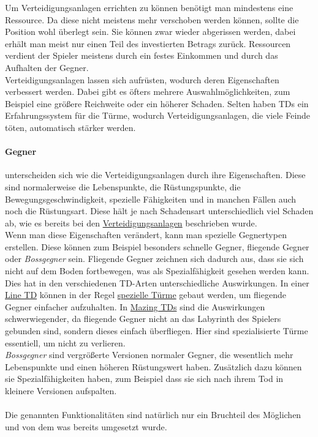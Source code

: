Um Verteidigungsanlagen errichten zu können benötigt man mindestens eine Ressource. Da diese nicht meistens mehr verschoben werden können, sollte die Position wohl überlegt sein. Sie können zwar wieder abgerissen werden, dabei erhält man meist nur einen Teil des investierten Betrags zurück. Ressourcen verdient der Spieler meistens durch ein festes Einkommen und durch das Aufhalten der Gegner.\\
Verteidigungsanlagen lassen sich aufrüsten, wodurch deren Eigenschaften verbessert werden. Dabei gibt es öfters mehrere Auswahlmöglichkeiten, zum Beispiel eine größere Reichweite oder ein höherer Schaden. Selten haben TDs ein Erfahrungssystem für die Türme, wodurch Verteidigungsanlagen, die viele Feinde töten, automatisch stärker werden.

\paragraph{Gegner} unterscheiden sich wie die Verteidigungsanlagen durch ihre Eigenschaften. Diese sind normalerweise die Lebenspunkte, die Rüstungspunkte, die Bewegungsgeschwindigkeit, spezielle Fähigkeiten und in manchen Fällen auch noch die Rüstungsart. Diese hält je nach Schadensart unterschiedlich viel Schaden ab, wie es bereits bei den \hyperlink{Schadensarten}{Verteidigungsanlagen} beschrieben wurde.\\
Wenn man diese Eigenschaften verändert, kann man spezielle \hypertarget{DefintionGegnertypen}{Gegnertypen} erstellen. Diese können zum Beispiel besonders schnelle Gegner, fliegende Gegner oder \textit{Bossgegner} sein. Fliegende Gegner zeichnen sich dadurch aus, dass sie sich nicht auf dem Boden fortbewegen, was als Spezialfähigkeit gesehen werden kann. Dies hat in den verschiedenen TD-Arten unterschiedliche Auswirkungen. In einer \hyperlink{DefinitionLineTD}{Line TD} können in der Regel \hyperlink{DefinitionVerteidungsanlageTypen}{spezielle Türme} gebaut werden, um fliegende Gegner einfacher aufzuhalten. In \hyperlink{DefinitionMazingTD}{Mazing TDs} sind die Auswirkungen schwerwiegender, da fliegende Gegner nicht an das Labyrinth des Spielers gebunden sind, sondern dieses einfach überfliegen. Hier sind spezialisierte Türme essentiell, um nicht zu verlieren.\\
\textit{Bossgegner} sind vergrößerte Versionen normaler Gegner, die wesentlich mehr Lebenspunkte und einen höheren Rüstungswert haben. Zusätzlich dazu können sie Spezialfähigkeiten haben, zum Beispiel dass sie sich nach ihrem Tod in kleinere Versionen aufspalten.\\
\\
Die genannten Funktionalitäten sind natürlich nur ein Bruchteil des Möglichen und von dem was bereits umgesetzt wurde.
\pagebreak


